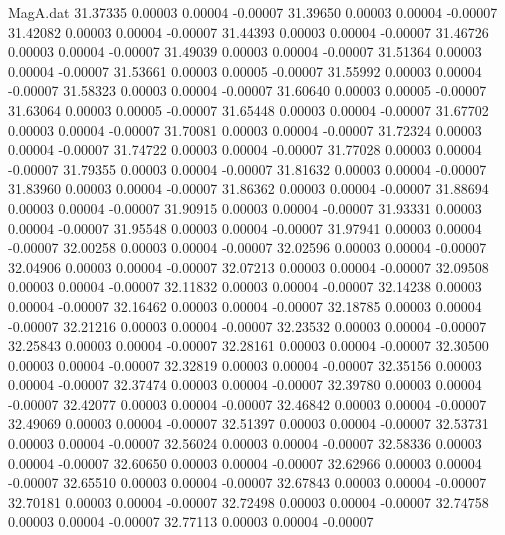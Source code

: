 \begin{filecontents}{MagA.dat}
  31.37335    0.00003    0.00004   -0.00007
  31.39650    0.00003    0.00004   -0.00007
  31.42082    0.00003    0.00004   -0.00007
  31.44393    0.00003    0.00004   -0.00007
  31.46726    0.00003    0.00004   -0.00007
  31.49039    0.00003    0.00004   -0.00007
  31.51364    0.00003    0.00004   -0.00007
  31.53661    0.00003    0.00005   -0.00007
  31.55992    0.00003    0.00004   -0.00007
  31.58323    0.00003    0.00004   -0.00007
  31.60640    0.00003    0.00005   -0.00007
  31.63064    0.00003    0.00005   -0.00007
  31.65448    0.00003    0.00004   -0.00007
  31.67702    0.00003    0.00004   -0.00007
  31.70081    0.00003    0.00004   -0.00007
  31.72324    0.00003    0.00004   -0.00007
  31.74722    0.00003    0.00004   -0.00007
  31.77028    0.00003    0.00004   -0.00007
  31.79355    0.00003    0.00004   -0.00007
  31.81632    0.00003    0.00004   -0.00007
  31.83960    0.00003    0.00004   -0.00007
  31.86362    0.00003    0.00004   -0.00007
  31.88694    0.00003    0.00004   -0.00007
  31.90915    0.00003    0.00004   -0.00007
  31.93331    0.00003    0.00004   -0.00007
  31.95548    0.00003    0.00004   -0.00007
  31.97941    0.00003    0.00004   -0.00007
  32.00258    0.00003    0.00004   -0.00007
  32.02596    0.00003    0.00004   -0.00007
  32.04906    0.00003    0.00004   -0.00007
  32.07213    0.00003    0.00004   -0.00007
  32.09508    0.00003    0.00004   -0.00007
  32.11832    0.00003    0.00004   -0.00007
  32.14238    0.00003    0.00004   -0.00007
  32.16462    0.00003    0.00004   -0.00007
  32.18785    0.00003    0.00004   -0.00007
  32.21216    0.00003    0.00004   -0.00007
  32.23532    0.00003    0.00004   -0.00007
  32.25843    0.00003    0.00004   -0.00007
  32.28161    0.00003    0.00004   -0.00007
  32.30500    0.00003    0.00004   -0.00007
  32.32819    0.00003    0.00004   -0.00007
  32.35156    0.00003    0.00004   -0.00007
  32.37474    0.00003    0.00004   -0.00007
  32.39780    0.00003    0.00004   -0.00007
  32.42077    0.00003    0.00004   -0.00007
  32.46842    0.00003    0.00004   -0.00007
  32.49069    0.00003    0.00004   -0.00007
  32.51397    0.00003    0.00004   -0.00007
  32.53731    0.00003    0.00004   -0.00007
  32.56024    0.00003    0.00004   -0.00007
  32.58336    0.00003    0.00004   -0.00007
  32.60650    0.00003    0.00004   -0.00007
  32.62966    0.00003    0.00004   -0.00007
  32.65510    0.00003    0.00004   -0.00007
  32.67843    0.00003    0.00004   -0.00007
  32.70181    0.00003    0.00004   -0.00007
  32.72498    0.00003    0.00004   -0.00007
  32.74758    0.00003    0.00004   -0.00007
  32.77113    0.00003    0.00004   -0.00007

\end{filecontents}
